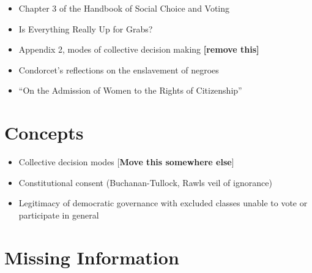\begin{itemize}
    \item Chapter 3 of the Handbook of Social Choice and Voting \autocite[35-51]{Heckelman2015}
    \item Is Everything Really Up for Grabs? \autocite{Kassner2006}
    \item Appendix 2, modes of collective decision making \textbf{[remove this]}
    \item Condorcet's reflections on the enslavement of negroes \autocite{Condorcet1781}
    \item ``On the Admission of Women to the Rights of Citizenship'' \autocite{Condorcet1789}
\end{itemize}

\section{Concepts}

\begin{itemize}
    \item Collective decision modes [\textbf{Move this somewhere else}]
    \item Constitutional consent (Buchanan-Tullock, Rawls veil of ignorance)
    \item Legitimacy of democratic governance with excluded classes unable to vote or participate in general
\end{itemize}

\section{Missing Information}

